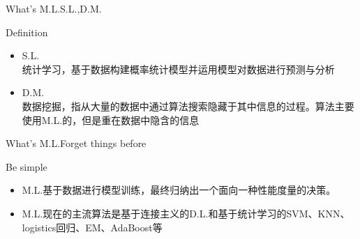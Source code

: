 \documentclass{beamer}
\begin{document}
\begin{frame}{What\rq{}s M.L.}{\quad\quad\quad S.L.,D.M.}

  \begin{block}{Definition}
   \begin{itemize}
  \item S.L.\\统计学习，基于数据构建概率统计模型并运用模型对数据进行预测与分析
  \item D.M.\\数据挖掘，指从大量的数据中通过算法搜索隐藏于其中信息的过程。算法主要使用M.L.的，但是重在数据中隐含的信息
  \end{itemize}
  \end{block}
\end{frame}


\begin{frame}{What\rq{}s M.L.}{\quad\quad\quad Forget things before}

  \begin{block}{Be simple}
   \begin{itemize}
  \item M.L.基于数据进行模型训练，最终归纳出一个面向一种性能度量的决策。
  \item M.L.现在的主流算法是基于连接主义的D.L.和基于统计学习的SVM、KNN、logistics回归、EM、AdaBoost等
  \end{itemize}
  \end{block}
\end{frame}
\end{document}
